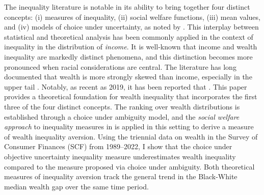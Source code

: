 The inequality literature is notable in its ability to bring together four distinct concepts: (i) measures of inequality, (ii) social welfare functions, (iii) mean values, and (iv) models of choice under uncertainty, as noted by \cite{hd20}. This interplay between statistical and theoretical analysis has been commonly applied in the context of inequality in the distribution of \textit{income}. It is well-known that income and wealth inequality are markedly distinct phenomena, and this distinction becomes more pronounced when racial considerations are central. The literature has long documented that wealth is more strongly skewed than income, especially in the upper tail \parencite{jbab18}. Notably, as recent as 2019, it has been reported that . This paper provides a theoretical foundation for wealth inequality that incorporates the first three of the four distinct concepts. The ranking over wealth distributions is established through a choice under ambiguity model, and the \textit{social welfare approach} to inequality measures in \cite{aa71} is applied in this setting to derive a measure of wealth inequality aversion. Using the triennial data on wealth in the Survey of Consumer Finances (SCF) from 1989--2022, I show that the choice under objective uncertainty inequality measure underestimates wealth inequality compared to the measure proposed via choice under ambiguity. Both theoretical measures of inequality aversion track the general trend in the Black-White median wealth gap over the same time period.
